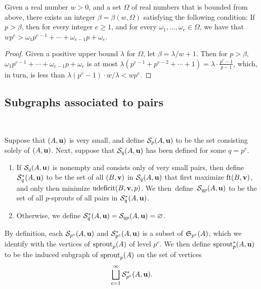 \documentclass[11pt]{amsart}
\newcommand{\udeficit}{\operatorname{udeficit}}
\renewcommand{\S}{\mathcal{S}}
\begin{document}
\begin{lemma}
   \label{positive-polynomial: L}
   Given a real number $w > 0$, and a set $\Omega$ of real numbers that is bounded from above, there exists an integer $\beta = \beta(w, \Omega)$ satisfying the following condition\textup:
   If $p > \beta$, then for every integer $e \geq 1$, and for every $\omega_1, \ldots, \omega_e \in \Omega$, we have that $wp^{e} >  \omega_1 p^{e-1} + \cdots + \omega_{e-1} p + \omega_e$.
\end{lemma}

\begin{proof}
   Given a positive upper bound $\lambda$ for $\Omega$, let $\beta = \lambda/w  + 1$.
   Then for $p>\beta$, $\omega_1 p^{e-1} + \cdots + \omega_{e-1}  p + \omega_e$ is at most $\lambda(p^{e-1} + p^{e-2} + \cdots + 1) = \lambda \cdot \frac{p^e-1}{p-1}$, which, in turn, is less than $\lambda (p^e-1) \cdot w/\lambda < w p^e$.
\end{proof}

\subsection{Subgraphs associated to pairs}

\ 

\begin{definition}
   Suppose that $(A,\mathbf{u})$ is very small, and define $\S_p(A,\vv{u})$ to be the set consisting solely of $(A,\mathbf{u})$.
   Next, suppose that $\S_q(A,\vv{u})$ has been defined for some $q=p^e$.
   \begin{enumerate}
      \item If $\S_q(A,\vv{u})$ is nonempty and consists only of very small pairs, then define $\S^{\ast}_q(A,\vv{u})$ to be the set of all $(B,\mathbf{v})$ in $\S_q(A,\vv{u})$ that first maximize $\operatorname{ft}(B, \mathbf{v})$, and only then minimize $\udeficit(B,\vv{v},p)$.  We then~define~$\S_{qp}(A,\vv{u})$ to be the set of all $p$-sprouts of all pairs in $\S^{\ast}_q(A,\vv{u})$.
      \item Otherwise, we define $\S_q^{\ast}(A,\vv{u})=\S_{qp}(A,\vv{u}) = \emptyset$.
   \end{enumerate}
   By definition, each $\S_{p^e}(A,\vv{u})$ and $\S^{\ast}_{p^e}(A,\vv{u})$ is a subset of $\mathfrak{S}_{p^e}(A)$, which we identify with the vertices of $\operatorname{sprout}_p(A)$ of level $p^e$.
   We then define $\operatorname{sprout}_p^{\ast}(A,\mathbf{u})$ to be the induced subgraph of $\operatorname{sprout}_p(A)$ on the set of vertices
   \[ \bigsqcup_{e=1}^{\infty} \S^{\ast}_{p^e}(A,\vv{u}). \]
\end{definition}
\end{document}

